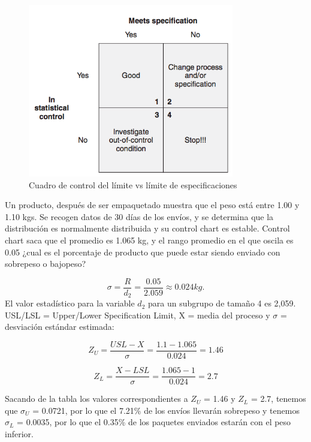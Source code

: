 \documentclass[]{article}
\begin{document}
\begin{figure}[ht!]
	\centering
	\includegraphics[width=90mm]{imagenes/Controllimitversusspecificationlimitgrid.png}
	\caption{Cuadro de control del límite vs límite de especificaciones}
	\label{fig:Controllimitversusspecificationlimitgrid}
\end{figure}

Un producto, después de ser empaquetado muestra que el peso está entre 1.00 y 1.10 kgs. Se recogen datos de 30 días de los envíos, y se determina que la distribución es normalmente distribuida y su control chart es estable. Control chart saca que el promedio es 1.065 kg, y el rango promedio en el que oscila es 0.05 ¿cual es el porcentaje de producto que puede estar siendo enviado con sobrepeso o bajopeso?

\begin{equation}
\sigma = \frac{R}{d_2} = \frac{0.05}{2.059} \approx 0.024 kg.
\end{equation}
El valor estadístico para la variable $d_2$ para un subgrupo de tamaño 4 es 2,059. USL/LSL = Upper/Lower Specification Limit, X = media del proceso y $\sigma$ = desviación estándar estimada:

\begin{equation}
Z_U = \frac{USL - X}{\sigma} = \frac{1.1 - 1.065}{0.024} = 1.46
\end{equation}

\begin{equation}
Z_L = \frac{X - LSL}{\sigma} = \frac{1.065 - 1}{0.024} = 2.7
\end{equation}

Sacando de la tabla los valores correspondientes a $Z_U$ = 1.46 y $Z_L$ = 2.7, tenemos que $\sigma_U$ = 0.0721, por lo que el 7.21\% de los envíos llevarán sobrepeso y tenemos $\sigma_L$ = 0.0035, por lo que el 0.35\% de los paquetes enviados estarán con el peso inferior.
\end{document}
